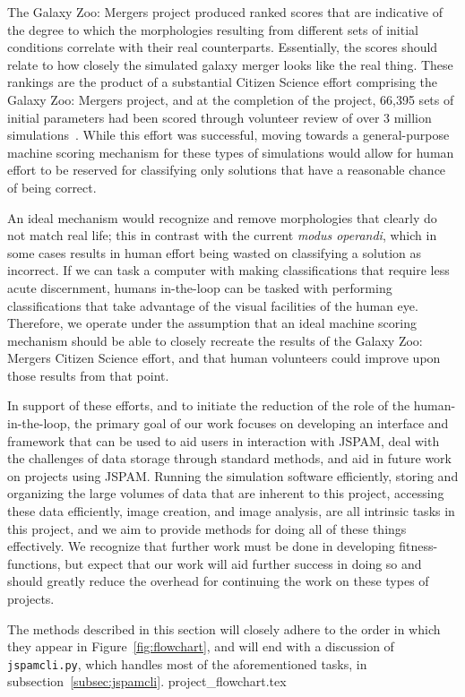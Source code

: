 
The Galaxy Zoo: Mergers project produced ranked scores that are indicative of
the degree to which the morphologies resulting from different sets of
initial conditions correlate with their real counterparts. Essentially, the
scores should relate to how closely the simulated galaxy merger looks like the
real thing.
These rankings are the product of a substantial Citizen Science effort comprising
the Galaxy Zoo: Mergers project, and at the completion of the project,
66,395 sets of initial parameters had been scored through volunteer review of
over 3 million simulations~\cite{Holincheck2015}.
While this effort was successful, moving towards a general-purpose machine
scoring mechanism for these types of simulations would allow for human effort to
be reserved for classifying only solutions that have a reasonable chance
of being correct.

An ideal mechanism would recognize and remove morphologies
that clearly do not match real life; this in contrast with the
current \textit{modus operandi}, which in some cases results in human effort
being wasted on classifying a  solution as incorrect.
If we can task a computer with making classifications that require
less acute discernment, humans in-the-loop can be tasked with
performing classifications that take advantage of the visual facilities of
the human eye.
Therefore, we operate under the assumption that an ideal machine scoring
mechanism should be able to closely recreate the results of the Galaxy Zoo:
Mergers Citizen Science effort, and that human volunteers could improve upon
those results from that point.

In support of these efforts, and to initiate the reduction of the role of the
human-in-the-loop, the primary goal of our work focuses on
developing an interface and framework that can be used to aid users in
interaction with JSPAM, deal with the challenges of data storage through
standard methods, and aid in future work on projects using JSPAM.
Running the simulation software efficiently, storing and organizing the large
volumes of data that are inherent to this project, accessing these data
efficiently, image creation, and image analysis, are all intrinsic tasks in
this project, and we aim to provide methods for doing all of these things
effectively.
We recognize that further work must be done in developing fitness-functions,
but expect that our work will aid further success in doing so and should
greatly reduce the overhead for continuing the
work on these types of projects.

The methods described in this section will closely adhere to the order in which
they appear in Figure~\ref{fig:flowchart}, and will end with a
discussion of \texttt{jspamcli.py}, which handles most of the aforementioned
tasks, in subsection~\ref{subsec:jspamcli}.
\clearpage
{project_flowchart.tex}
